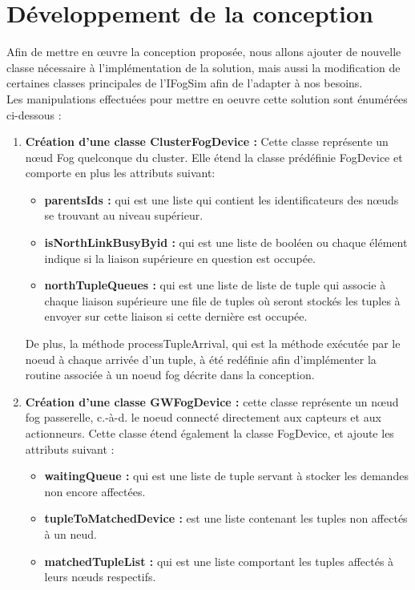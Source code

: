 \section{Développement de la conception}
Afin de mettre en œuvre la conception proposée, nous allons ajouter de nouvelle classe nécessaire à l’implémentation de la solution, mais aussi la modification de certaines classes principales de l’IFogSim afin de l’adapter à nos besoins.\\
Les manipulations effectuées pour mettre en oeuvre cette solution sont énumérées ci-dessous : 
\begin{enumerate}
    \item \textbf{Création d’une classe ClusterFogDevice :} Cette classe représente un nœud Fog quelconque du cluster. Elle étend la classe prédéfinie FogDevice et comporte en plus les attributs suivant:
\begin{itemize}
    \item \textbf{parentsIds :} qui est une liste qui contient les identificateurs des nœuds se trouvant au niveau supérieur.
    \item \textbf{isNorthLinkBusyByid :} qui est une liste de booléen ou chaque élément indique si la liaison supérieure en question est occupée.
    \item \textbf{northTupleQueues :} qui est une liste de liste de tuple qui associe à chaque liaison supérieure une file de tuples où seront stockés les tuples à envoyer sur cette liaison si cette dernière est occupée.
\end{itemize}
De plus, la méthode  processTupleArrival, qui est la méthode exécutée par le noeud à  chaque arrivée d’un tuple, à été redéfinie afin d’implémenter la routine associée à un noeud fog décrite dans la conception.
     \item \textbf{Création d’une classe GWFogDevice :} cette classe représente un nœud fog passerelle, c.-à-d. le noeud connecté directement aux capteurs et aux actionneurs. Cette classe étend également la classe FogDevice, et ajoute les attributs suivant :
     \begin{itemize}
     \item \textbf{waitingQueue :} qui est une liste de tuple servant à stocker les demandes non encore affectées.
     \item \textbf{tupleToMatchedDevice :} est une liste contenant les tuples non affectés à un neud.
     \item \textbf{matchedTupleList :} qui est une liste comportant les tuples affectés à leurs nœuds respectifs.

\end{itemize}
\end{enumerate}
